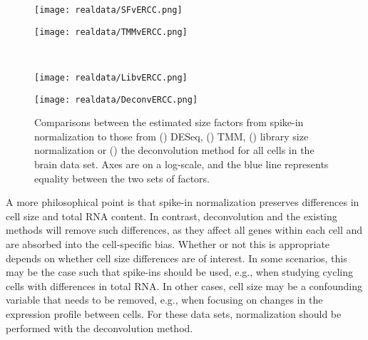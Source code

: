 \documentclass{article}
\begin{document}
\begin{figure}[btp]
    \begin{minipage}{0.48\textwidth}
        \texttt{[image: realdata/SFvERCC.png]}
        \subcaption{}\label{subfig:spike_sf}
    \end{minipage}
    \begin{minipage}{0.48\textwidth}
        \texttt{[image: realdata/TMMvERCC.png]}
        \subcaption{}\label{subfig:spike_tmm}
    \end{minipage} \\ 
    \begin{minipage}{0.48\textwidth}
        \texttt{[image: realdata/LibvERCC.png]}
        \subcaption{}\label{subfig:spike_lib}
    \end{minipage} 
    \begin{minipage}{0.48\textwidth}
        \texttt{[image: realdata/DeconvERCC.png]}
        \subcaption{}\label{subfig:spike_sum}
    \end{minipage}
    \caption{
        Comparisons between the estimated size factors from spike-in normalization to those from () DESeq, () TMM,
            () library size normalization or () the deconvolution method for all cells in the brain data set.                  
        Axes are on a log-scale, and the blue line represents equality between the two sets of factors.
    }
    \label{fig:real_spike}  
\end{figure}

A more philosophical point is that spike-in normalization preserves differences in cell size and total RNA content.
In contrast, deconvolution and the existing methods will remove such differences, as they affect all genes within each cell and are absorbed into the cell-specific bias.
Whether or not this is appropriate depends on whether cell size differences are of interest.
In some scenarios, this may be the case such that spike-ins should be used, e.g., when studying cycling cells with differences in total RNA.
In other cases, cell size may be a confounding variable that needs to be removed, e.g., when focusing on changes in the expression profile between cells.
For these data sets, normalization should be performed with the deconvolution method.
\end{document}
